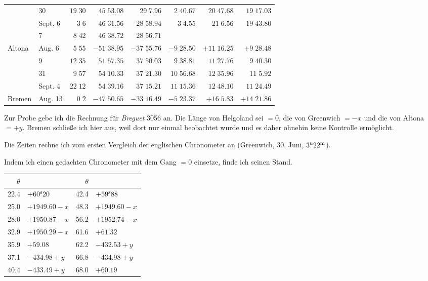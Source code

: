 \begin{center}
\begin{tabular}{ll|r|r|r|r|r|r}
 & 30 & $19\;30$ & $45\;53.08$ & $29\;7.96$ & $2\;40.67$ & $20\;47.68$ & $19\;17.03$ \\
 & Sept. 6 & $3\;6$ & $46\;31.56$ & $28\;58.94$ & $3\;4.55$ & $21\;6.56$ & $19\;43.80$ \\
 & 7 & $8\;42$ & $46\;38.72$ & $28\;56.71$ &  &  &  \\
Altona & Aug. 6 & $5\;55$ & $-51\;38.95$ & $-37\;55.76$ & $-9\;28.50$ & $+11\;16.25$ & $+9\;28.48$ \\
 & 9 & $12\;35$ & $51\;57.35$ & $37\;50.03$ & $9\;38.81$ & $11\;27.76$ & $9\;40.30$ \\
 & 31 & $9\;57$ & $54\;10.33$ & $37\;21.30$ & $10\;56.68$ & $12\;35.96$ & $11\;5.92$ \\
 & Sept. 4 & $22\;12$ & $54\;39.16$ & $37\;15.21$ & $11\;15.36$ & $12\;48.10$ & $11\;24.49$ \\
Bremen & Aug. 13 & $0\;2$ & $-47\;50.65$ & $-33\;16.49$ & $-5\;23.37$ & $+16\;5.83$ & $+14\;21.86$ \\
\end{tabular}
\endgroup
\end{center}

Zur Probe gebe ich die Rechnung für \emph{Breguet} 3056 an. Die Länge von Helgoland sei $=0$, die von Greenwich $=-x$ und die von Altona $=+y$. Bremen schließe ich hier aus, weil dort nur einmal beobachtet wurde und es daher ohnehin keine Kontrolle ermöglicht.

Die Zeiten rechne ich vom ersten Vergleich der englischen Chronometer an (Greenwich, 30. Juni, $3^{\rm u}22^{\rm m}$).

Indem ich einen gedachten Chronometer mit dem Gang $=0$ einsetze, finde ich seinen Stand.

\begin{center}
\begin{tabular}{r|l||r|l}
$\theta$ & & $\theta$ & \\
\hline
22.4 & $+60^{\rm s}20$ & 42.4 & $+59^{\rm s}88$ \\
25.0 & $+1949.60-x$ & 48.3 & $+1949.60-x$ \\
28.0 & $+1950.87-x$ & 56.2 & $+1952.74-x$ \\
32.9 & $+1950.29-x$ & 61.6 & $+61.32$ \\
35.9 & $+59.08$ & 62.2 & $-432.53+y$ \\
37.1 & $-434.98+y$ & 66.8 & $-434.98+y$ \\
40.4 & $-433.49+y$ & 68.0 & $+60.19$ \\
\end{tabular}
\end{center}

